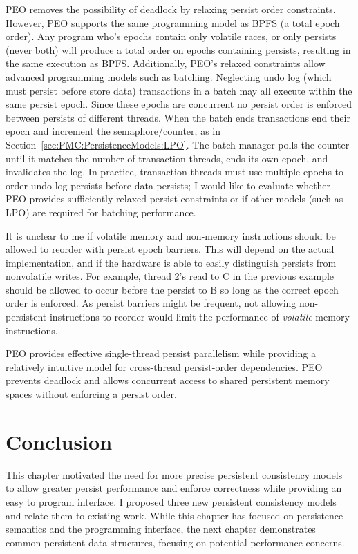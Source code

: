 PEO removes the possibility of deadlock by relaxing persist order constraints.
However, PEO supports the same programming model as BPFS (a total epoch order).
Any program who's epochs contain only volatile races, or only persists (never both) will produce a total order on epochs containing persists, resulting in the same execution as BPFS.
Additionally, PEO's relaxed constraints allow advanced programming models such as batching.
Neglecting undo log (which must persist before store data) transactions in a batch may all execute within the same persist epoch.
Since these epochs are concurrent no persist order is enforced between persists of different threads.
When the batch ends transactions end their epoch and increment the semaphore/counter, as in Section~\ref{sec:PMC:PersistenceModels:LPO}.
The batch manager polls the counter until it matches the number of transaction threads, ends its own epoch, and invalidates the log.
In practice, transaction threads must use multiple epochs to order undo log persists before data persists; I would like to evaluate whether PEO provides sufficiently relaxed persist constraints or if other models (such as LPO) are required for batching performance.

It is unclear to me if volatile memory and non-memory instructions should be allowed to reorder with persist epoch barriers.
This will depend on the actual implementation, and if the hardware is able to easily distinguish persists from nonvolatile writes.
For example, thread 2's read to C in the previous example should be allowed to occur before the persist to B so long as the correct epoch order is enforced.
As persist barriers might be frequent, not allowing non-persistent instructions to reorder would limit the performance of \emph{volatile} memory instructions.

PEO provides effective single-thread persist parallelism while providing a relatively intuitive model for cross-thread persist-order dependencies.
PEO prevents deadlock and allows concurrent access to shared persistent memory spaces without enforcing a persist order.

\section{Conclusion}
\label{sec:PMC:Conclusion}

This chapter motivated the need for more precise persistent consistency models to allow greater persist performance and enforce correctness while providing an easy to program interface.
I proposed three new persistent consistency models and relate them to existing work.
While this chapter has focused on persistence semantics and the programming interface, the next chapter demonstrates common persistent data structures, focusing on potential performance concerns.
